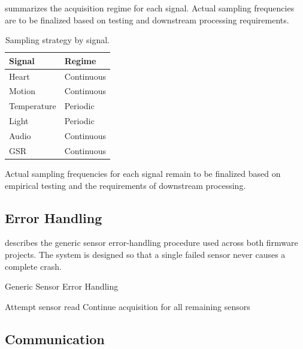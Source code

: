  summarizes the acquisition regime for each signal. Actual sampling frequencies are to be finalized based on testing and downstream processing requirements.

\begin{table}[H]
\centering
\caption{Sampling strategy by signal.}
\label{tab:sampling-strategy}
\small
\begin{tabularx}{\columnwidth}{@{}Y l@{}}
\toprule
\textbf{Signal} & \textbf{Regime} \\
\midrule
Heart & Continuous \\
Motion & Continuous \\
Temperature & Periodic \\
Light & Periodic \\
Audio & Continuous \\
GSR & Continuous \\
\bottomrule
\end{tabularx}
\end{table}

\begin{requirementbox}
Actual sampling frequencies for each signal remain to be finalized based on empirical testing and the requirements of downstream processing.
\end{requirementbox}

\subsection{Error Handling}
\label{sec:error-handling-ch6}

 describes the generic sensor error-handling procedure used across both firmware projects. The system is designed so that a single failed sensor never causes a complete crash.

\begin{algorithm}[t]
\small
\caption{Generic Sensor Error Handling}
\label{alg:error-handling}
Attempt sensor read\;
Continue acquisition for all remaining sensors\;
\end{algorithm}

\subsection{Communication}
\label{sec:communication-ch6}

